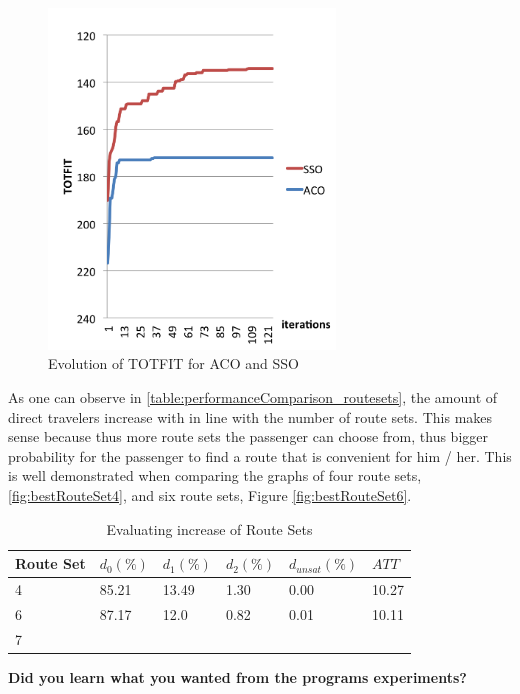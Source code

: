 
 \begin{figure}[H]
    \begin{center}
    \includegraphics[width=3in]{assets/acovsssoNEW.png}
    \end{center}
    \caption{Evolution of TOTFIT for ACO and SSO }
    \label{fig:acovssso} 
\end{figure}

As one can observe in \vref{table:performanceComparison_routesets}, the amount of direct travelers increase with in line with the number of route sets. This makes sense because thus more route sets the passenger can choose from, thus bigger probability for the passenger to find a route that is convenient for him / her. This is well demonstrated when comparing the graphs of four route sets, \vref{fig:bestRouteSet4}, and six route sets, Figure \vref{fig:bestRouteSet6}.  

 \begin{table}[H]
    \centering
    \begin{tabular}{|l||l|l|l|l|l|}
    \hline
    Route Set & $d_0(\%)$ & $d_1(\%)$ & $d_2(\%)$ & $d_{unsat}(\%)$ & $ATT$ \\
    \hline
    4 & 85.21 & 13.49 & 1.30 & 0.00 & 10.27\\
    \hline
    6 & 87.17 & 12.0 & 0.82 & 0.01 & 10.11\\
    \hline
    7 \\
    \hline
    \end{tabular}
    \caption {Evaluating increase of Route Sets}
    \label{table:performanceComparison_routesets}
\end{table}

\textbf{Did you learn what you wanted from the programs experiments?}